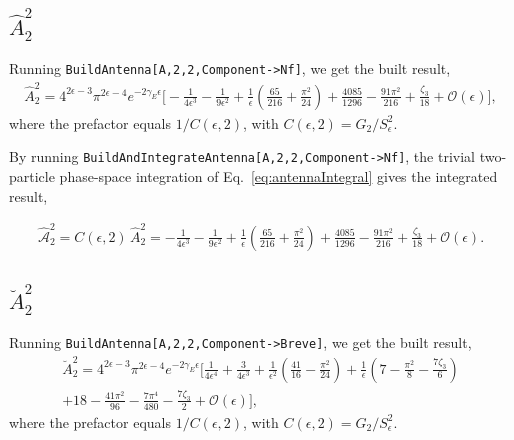 \subsection{$\hat A_2^2$}

Running \texttt{BuildAntenna[A,2,2,Component->Nf]}, we get the built result,
\begin{equation}
    \begin{gathered}
        \hat A_2^2 = 4^{2\epsilon-3}\pi^{2\epsilon-4}e^{-2\gamma_E\epsilon}\bigg[-\frac{1}{4\epsilon^3}-\frac1{9\epsilon^2}+\frac1\epsilon\!\left(\frac{65}{216}+\frac{\pi^2}{24}\right) + \frac{4085}{1296} - \frac{91\pi^2}{216} + \frac{\zeta_3}{18}+\mathcal O(\epsilon)\bigg],
    \end{gathered}
\end{equation}
where the prefactor equals $1/C(\epsilon,2)$, with $C(\epsilon,2)=G_2/S_\epsilon^2$.

\begin{sloppypar}
By running \texttt{BuildAndIntegrateAntenna[A,2,2,Component->Nf]}, the trivial two-particle
phase-space integration of Eq.~\eqref{eq:antennaIntegral} gives the integrated result,
\end{sloppypar}\noindent
\begin{equation}
    \begin{gathered}
        \hat{\mathcal A}_2^2 = C(\epsilon,2)\,\hat A_2^2 = -\frac{1}{4\epsilon^3}-\frac1{9\epsilon^2}+\frac1\epsilon\!\left(\frac{65}{216}+\frac{\pi^2}{24}\right) + \frac{4085}{1296} - \frac{91\pi^2}{216} + \frac{\zeta_3}{18}+\mathcal O(\epsilon).
    \end{gathered}
\end{equation}

\subsection{$\breve A_2^2$}

Running \texttt{BuildAntenna[A,2,2,Component->Breve]}, we get the built result,
\begin{equation}
    \begin{gathered}
        \breve A_2^2 = 4^{2\epsilon-3}\pi^{2\epsilon-4}e^{-2\gamma_E\epsilon}\bigg[\frac1{4\epsilon^4}+\frac3{4\epsilon^3}+\frac1{\epsilon^2}\!\left(\frac{41}{16}-\frac{\pi^2}{24}\right)+\frac1\epsilon\!\left(7-\frac{\pi^2}{8}-\frac{7\zeta_3}{6}\right)\\
        +18-\frac{41\pi^2}{96}-\frac{7\pi^4}{480}-\frac{7\zeta_3}{2}+\mathcal O(\epsilon)\bigg],
    \end{gathered}
\end{equation}
where the prefactor equals $1/C(\epsilon,2)$, with $C(\epsilon,2)=G_2/S_\epsilon^2$.

